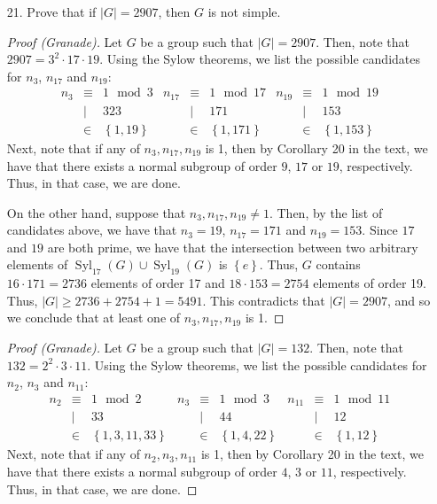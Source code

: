 \documentclass[10pt]{article}
\newcommand{\Syl}{\operatorname{Syl}}
\begin{document}
\begin{itemize}
\begin{proof}
\end{proof}

\item [21.]  Prove that if $\left|G\right|=2907$, then $G$ is not simple.

\begin{proof}
[Proof (Granade)] Let $G$ be a group such that $\left|G\right|=2907$.
Then, note that $2907=3^{2}\cdot17\cdot19$. Using the Sylow theorems,
we list the possible candidates for $n_{3}$, $n_{17}$ and $n_{19}$:\[
\begin{array}{rcl|rcl|rcl}
n_{3} & \equiv & 1\,\bmod3 & n_{17} & \equiv & 1\,\bmod17 & n_{19} & \equiv & 1\,\bmod19\\
 & \mid & 323 &  & \mid & 171 &  & \mid & 153\\
 & \in & \left\{ 1,19\right\}  &  & \in & \left\{ 1,171\right\}  &  & \in & \left\{ 1,153\right\} \end{array}\]
Next, note that if any of $n_{3},n_{17},n_{19}$ is 1, then by Corollary
20 in the text, we have that there exists a normal subgroup of order
$9$, $17$ or $19$, respectively. Thus, in that case, we are done.

On the other hand, suppose that $n_{3},n_{17},n_{19}\ne1$. Then,
by the list of candidates above, we have that $n_{3}=19$, $n_{17}=171$
and $n_{19}=153$. Since $17$ and $19$ are both prime, we have that
the intersection between two arbitrary elements of $\Syl_{17}\left(G\right)\cup\Syl_{19}\left(G\right)$
is $\left\{ e\right\} $. Thus, $G$ contains $16\cdot171=2736$ elements
of order 17 and $18\cdot153=2754$ elements of order 19. Thus, $\left|G\right|\ge2736+2754+1=5491$.
This contradicts that $\left|G\right|=2907$, and so we conclude that
at least one of $n_{3},n_{17},n_{19}$ is 1.
\end{proof}

\begin{proof}
[Proof (Granade)] Let $G$ be a group such that $\left|G\right|=132$.
Then, note that $132=2^{2}\cdot3\cdot11$. Using the Sylow theorems,
we list the possible candidates for $n_{2}$, $n_{3}$ and $n_{11}$:\[
\begin{array}{rcl|rcl|rcl}
n_{2} & \equiv & 1\,\bmod2 & n_{3} & \equiv & 1\,\bmod3 & n_{11} & \equiv & 1\,\bmod11\\
 & \mid & 33 &  & \mid & 44 &  & \mid & 12\\
 & \in & \left\{ 1,3,11,33\right\}  &  & \in & \left\{ 1,4,22\right\}  &  & \in & \left\{ 1,12\right\} \end{array}\]
Next, note that if any of $n_{2},n_{3},n_{11}$ is 1, then by Corollary
20 in the text, we have that there exists a normal subgroup of order
$4$, $3$ or $11$, respectively. Thus, in that case, we are done.


\end{proof}
\end{itemize}
\end{document}
